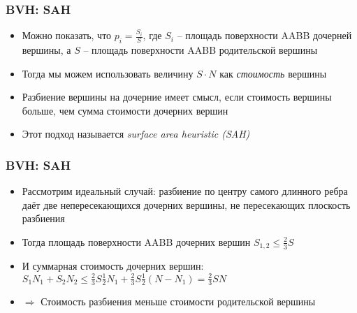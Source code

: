 \documentclass[handout,10pt]{beamer}
\begin{document}
\begin{frame}[fragile]
\frametitle{BVH: SAH}
\begin{itemize}
\item Можно показать, что \begin{math}p_i = \frac{S_i}{S}\end{math}, где \begin{math}S_i\end{math} -- площадь поверхности AABB дочерней вершины, а \begin{math}S\end{math} -- площадь поверхности AABB родительской вершины
\pause
\item Тогда мы можем использовать величину \begin{math}S \cdot N\end{math} как \textit{стоимость} вершины
\pause
\item Разбиение вершины на дочерние имеет смысл, если стоимость вершины больше, чем сумма стоимости дочерних вершин
\pause
\item Этот подход называется \textit{surface area heuristic (SAH)}
\end{itemize}
\end{frame}

\begin{frame}[fragile]
\frametitle{BVH: SAH}
\begin{itemize}
\item Рассмотрим идеальный случай: разбиение по центру самого длинного ребра даёт две непересекающихся дочерних вершины, не пересекающих плоскость разбиения
\pause
\item Тогда площадь поверхности AABB дочерних вершин \begin{math}S_{1,2} \leq \frac{2}{3}S\end{math}
\pause
\item И суммарная стоимость дочерних вершин: \begin{math}S_1N_1+S_2N_2 \leq \frac{2}{3}S\frac{1}{2}N_1+\frac{2}{3}S\frac{1}{2}(N-N_1) = \frac{2}{3}SN\end{math}
\pause
\item \begin{math}\Longrightarrow\end{math} Стоимость разбиения меньше стоимости родительской вершины
\end{itemize}
\end{frame}
\end{document}
